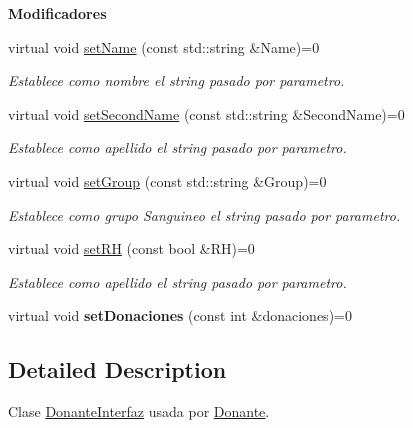 \begin{Indent}{\bf Modificadores}\par
\begin{DoxyCompactItemize}
\item 
virtual void \hyperlink{classed_1_1DonanteInterfaz_a368e9dadd91e8505ea63997ec8399847}{set\+Name} (const std\+::string \&Name)=0
\begin{DoxyCompactList}\small\item\em Establece como nombre el string pasado por parametro. \end{DoxyCompactList}\item 
virtual void \hyperlink{classed_1_1DonanteInterfaz_a9f400be5262f8c75d136ea6bec7c6ee6}{set\+Second\+Name} (const std\+::string \&Second\+Name)=0
\begin{DoxyCompactList}\small\item\em Establece como apellido el string pasado por parametro. \end{DoxyCompactList}\item 
virtual void \hyperlink{classed_1_1DonanteInterfaz_a1b03ede416eb0ca704180091590d185d}{set\+Group} (const std\+::string \&Group)=0
\begin{DoxyCompactList}\small\item\em Establece como grupo Sanguineo el string pasado por parametro. \end{DoxyCompactList}\item 
virtual void \hyperlink{classed_1_1DonanteInterfaz_abca20fa89aabd5d680ed16001b48b1fb}{set\+RH} (const bool \&RH)=0
\begin{DoxyCompactList}\small\item\em Establece como apellido el string pasado por parametro. \end{DoxyCompactList}\item 
virtual void {\bfseries set\+Donaciones} (const int \&donaciones)=0\hypertarget{classed_1_1DonanteInterfaz_a7a9848b716eae64ecc9276606e7b59a3}{}\label{classed_1_1DonanteInterfaz_a7a9848b716eae64ecc9276606e7b59a3}

\end{DoxyCompactItemize}
\end{Indent}


\subsection{Detailed Description}
Clase \hyperlink{classed_1_1DonanteInterfaz}{Donante\+Interfaz} usada por \hyperlink{classed_1_1Donante}{Donante}. 

